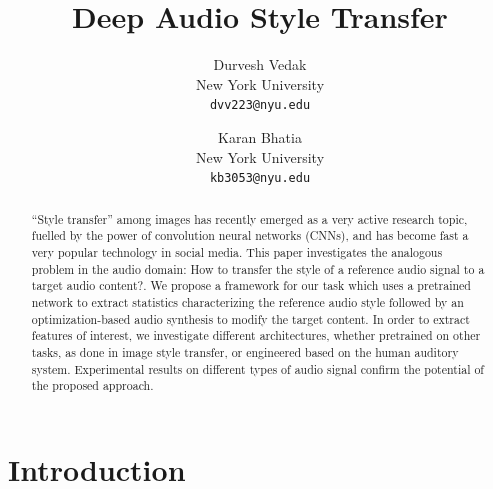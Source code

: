 \documentclass[10pt,twocolumn,letterpaper]{article}
\begin{document}
\title{Deep Audio Style Transfer}

\author{Durvesh Vedak\\
New York University\\
{\tt\small dvv223@nyu.edu}
\and
Karan Bhatia\\
New York University\\
{\tt\small kb3053@nyu.edu}
}


\maketitle

\begin{abstract}
“Style transfer” among images has recently emerged as a very
active research topic, fuelled by the power of convolution
neural networks (CNNs), and has become fast a very popular
technology in social media. This paper investigates the
analogous problem in the audio domain: How to transfer the
style of a reference audio signal to a target audio content?. We propose a framework for our task which uses a pretrained network to extract statistics characterizing the reference audio style followed by an optimization-based audio synthesis to modify the target content. In order to extract features of
interest, we investigate different architectures, whether pretrained
on other tasks, as done in image style transfer, or engineered
based on the human auditory system. Experimental
results on different types of audio signal confirm the potential
of the proposed approach.
\end{abstract}

\section{Introduction}
\end{document}

